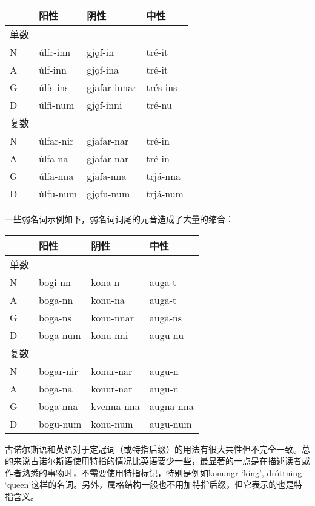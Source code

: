 \begin{longtable}{llll}
  \toprule
     & \textbf{阳性} & \textbf{阴性}  & \textbf{中性} \\
  \midrule
  \endhead
  \bottomrule
  \endfoot
  单数 &             &              &             \\
  N  & úlfr-inn    & gjǫf-in      & tré-it      \\
  A  & úlf-inn     & gjǫf-ina     & tré-it      \\
  G  & úlfs-ins    & gjafar-innar & trés-ins    \\
  D  & úlfi-num    & gjǫf-inni    & tré-nu      \\
  复数 &             &              &             \\
  N  & úlfar-nir   & gjafar-nar   & tré-in      \\
  A  & úlfa-na     & gjafar-nar   & tré-in      \\
  G  & úlfa-nna    & gjafa-nna    & trjá-nna    \\
  D  & úlfu-num    & gjǫfu-num    & trjá-num    \\
\end{longtable}

一些弱名词示例如下，弱名词词尾的元音造成了大量的缩合：

\begin{longtable}{llll}
  \toprule
     & \textbf{阳性} & \textbf{阴性} & \textbf{中性} \\
  \midrule
  \endhead
  \bottomrule
  \endfoot
  单数 &             &             &             \\
  N  & bogi-nn     & kona-n      & auga-t      \\
  A  & boga-nn     & konu-na     & auga-t      \\
  G  & boga-ns     & konu-nnar   & auga-ns     \\
  D  & boga-num    & konu-nni    & augu-nu     \\
  复数 &             &             &             \\
  N  & bogar-nir   & konur-nar   & augu-n      \\
  A  & boga-na     & konur-nar   & augu-n      \\
  G  & boga-nna    & kvenna-nna  & augna-nna   \\
  D  & bogu-num    & konu-num    & augu-num    \\
\end{longtable}

古诺尔斯语和英语对于定冠词（或特指后缀）的用法有很大共性但不完全一致。总的来说古诺尔斯语使用特指的情况比英语要少一些，最显著的一点是在描述读者或作者熟悉的事物时，不需要使用特指标记，特别是例如konungr
`king', dróttning
`queen'这样的名词。另外，属格结构一般也不用加特指后缀，但它表示的也是特指含义。

